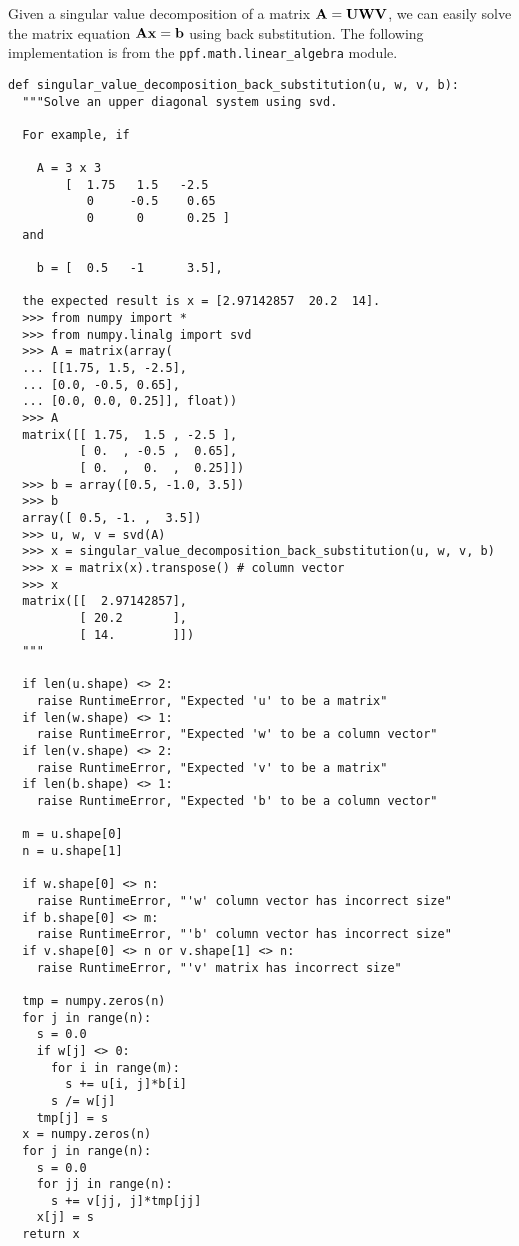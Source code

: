 Given a singular value decomposition of a matrix $\bf{A} = \bf{U}
\bf{W} \bf{V}$, we can easily solve the matrix equation $\bf{A} \bf{x}
= \bf{b}$ using back substitution. The following implementation is
from the \verb|ppf.math.linear_algebra| module.
\begin{verbatim}
def singular_value_decomposition_back_substitution(u, w, v, b):
  """Solve an upper diagonal system using svd.

  For example, if

    A = 3 x 3
        [  1.75   1.5   -2.5
           0     -0.5    0.65
           0      0      0.25 ]
  and

    b = [  0.5   -1      3.5],

  the expected result is x = [2.97142857  20.2  14].
  >>> from numpy import *
  >>> from numpy.linalg import svd
  >>> A = matrix(array(
  ... [[1.75, 1.5, -2.5],
  ... [0.0, -0.5, 0.65],
  ... [0.0, 0.0, 0.25]], float))
  >>> A
  matrix([[ 1.75,  1.5 , -2.5 ],
          [ 0.  , -0.5 ,  0.65],
          [ 0.  ,  0.  ,  0.25]])
  >>> b = array([0.5, -1.0, 3.5])
  >>> b
  array([ 0.5, -1. ,  3.5])
  >>> u, w, v = svd(A)
  >>> x = singular_value_decomposition_back_substitution(u, w, v, b)
  >>> x = matrix(x).transpose() # column vector
  >>> x
  matrix([[  2.97142857],
          [ 20.2       ],
          [ 14.        ]])
  """

  if len(u.shape) <> 2:
    raise RuntimeError, "Expected 'u' to be a matrix"
  if len(w.shape) <> 1:
    raise RuntimeError, "Expected 'w' to be a column vector"
  if len(v.shape) <> 2:
    raise RuntimeError, "Expected 'v' to be a matrix"
  if len(b.shape) <> 1:
    raise RuntimeError, "Expected 'b' to be a column vector"

  m = u.shape[0]
  n = u.shape[1]

  if w.shape[0] <> n:
    raise RuntimeError, "'w' column vector has incorrect size"
  if b.shape[0] <> m: 
    raise RuntimeError, "'b' column vector has incorrect size"
  if v.shape[0] <> n or v.shape[1] <> n:
    raise RuntimeError, "'v' matrix has incorrect size"

  tmp = numpy.zeros(n)
  for j in range(n):
    s = 0.0
    if w[j] <> 0:
      for i in range(m):
        s += u[i, j]*b[i]
      s /= w[j]
    tmp[j] = s
  x = numpy.zeros(n)
  for j in range(n):
    s = 0.0
    for jj in range(n):
      s += v[jj, j]*tmp[jj]
    x[j] = s
  return x  
\end{verbatim}

